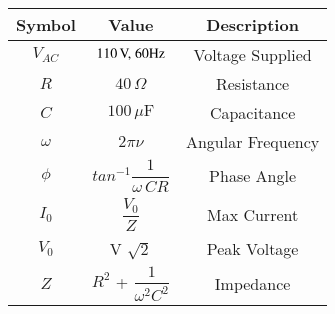 \begin{tabular}{|c|c|c|}
	\hline
	\textbf{Symbol} & \textbf{Value} & \textbf{Description}\\[6pt]
	\hline
	$V_{AC}$ & $110\,\text{V,\;60Hz}$  & Voltage Supplied\\[2pt]
	\hline
	$R$ & $40\, \Omega $ & Resistance\\[2pt]
	\hline
	$C$ & $100\, \mu\text{F}$ & Capacitance\\[2pt]
	\hline
	$\omega$ & $2\pi \nu $ & Angular Frequency\\[2pt]
	\hline
	$\phi$ & $tan^{-1}\dfrac{1}{\omega\, CR}$ & Phase Angle\\[4pt]
	\hline
	$I_0$ & $\dfrac{V_0}{Z}$ & Max Current\\[2pt]
	\hline
	$V_0$ & V $\sqrt{2}$ & Peak Voltage\\
	\hline
	$Z$ & $R^2$ + $\dfrac{1}{\omega^2C^2}$ & Impedance \\[4pt]
	\hline
\end{tabular}